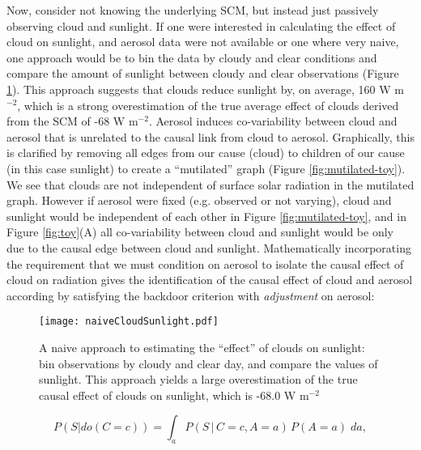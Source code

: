 \documentclass[12pt]{article}
\begin{document}
Now, consider not knowing the underlying SCM, but instead just
passively observing cloud and sunlight. If one were interested in
calculating the effect of cloud on sunlight, and aerosol data were not
available or one where very naive, one approach would be to bin the
data by cloudy and clear conditions and compare the amount of sunlight
between cloudy and clear observations (Figure
\ref{fig:naive-cloud-sunlight}). This approach suggests that clouds
reduce sunlight by, on average, 160 W m$^{-2}$, which is a strong
overestimation of the true average effect of clouds derived from the
SCM of -68 W m$^{-2}$. Aerosol induces co-variability between cloud
and aerosol that is unrelated to the causal link from cloud to
aerosol. Graphically, this is clarified by removing all edges from our
cause (cloud) to children of our cause (in this case sunlight) to
create a ``mutilated'' graph (Figure \ref{fig:mutilated-toy}). We see
that clouds are not independent of surface solar radiation in the
mutilated graph.  However if aerosol were fixed (e.g. observed or not
varying), cloud and sunlight would be independent of each other in
Figure \ref{fig:mutilated-toy}, and in Figure \ref{fig:toy}(A) all
co-variability between cloud and sunlight would be only due to the
causal edge between cloud and sunlight.  Mathematically incorporating
the requirement that we must condition on aerosol to isolate the
causal effect of cloud on radiation gives the identification of the
causal effect of cloud and aerosol according by satisfying the
backdoor criterion with \textit{adjustment} on aerosol:

\begin{figure}
  \texttt{[image: naiveCloudSunlight.pdf]}
  \caption{A naive approach to estimating the ``effect'' of clouds on
    sunlight: bin observations by cloudy and clear day, and compare
    the values of sunlight. This approach yields a large
    overestimation of the true causal effect of clouds on sunlight,
    which is -68.0 W m$^{-2}$}
  \label{fig:naive-cloud-sunlight}
\end{figure}

\begin{equation}
  P(S | do(C = c)) = \int_{a} P(S \, | \, C = c,
  A=a) \, P(A=a) \; da,
  \label{eq:3}
\end{equation}
\end{document}
